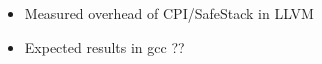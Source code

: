
\begin {itemize}
    \item Measured overhead of CPI/SafeStack in LLVM
    \item Expected results in gcc ??
\end {itemize}

